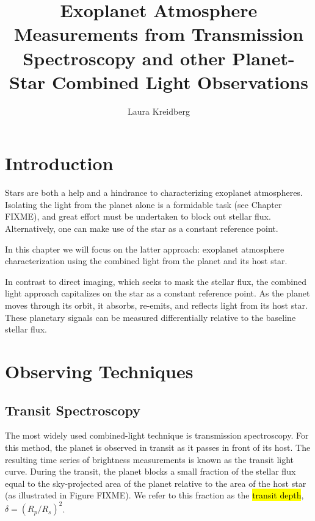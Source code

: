\documentclass[graybox,natbib,nosecnum]{svmult}
\newcommand{\hbindex}[1]{\hl{#1}\index{#1}}  %
\begin{document}
\title*{Exoplanet Atmosphere Measurements from Transmission Spectroscopy and other Planet-Star Combined Light Observations}
\author{Laura Kreidberg}
%
%
\maketitle



\section{Introduction }
Stars are both a help and a hindrance to characterizing exoplanet atmospheres.  Isolating the light from the planet alone is a formidable task (see Chapter FIXME), and great effort must be undertaken to block out stellar flux. Alternatively, one can make use of the star as a constant reference point. 

In this chapter we will focus on the latter approach: exoplanet atmosphere characterization using the combined light from the planet and its host star. 

In contrast to direct imaging, which seeks to mask the stellar flux, the combined light approach capitalizes on the star as a constant reference point. As the planet moves through its orbit, it absorbs, re-emits, and reflects light from its host star. These planetary signals can be measured differentially relative to the baseline stellar flux.

\section{Observing Techniques} 

\subsection{Transit Spectroscopy}
The most widely used combined-light technique is transmission spectroscopy. For this method, the planet is observed in transit as it passes in front of its host. The resulting time series of brightness measurements is known as the transit light curve. During the transit, the planet blocks a small fraction of the stellar flux equal to the sky-projected area of the planet relative to the area of the host star (as illustrated in Figure FIXME). We refer to this fraction as the \hbindex{transit depth}, $\delta = (R_p/R_s)^2$. 
\end{document}
